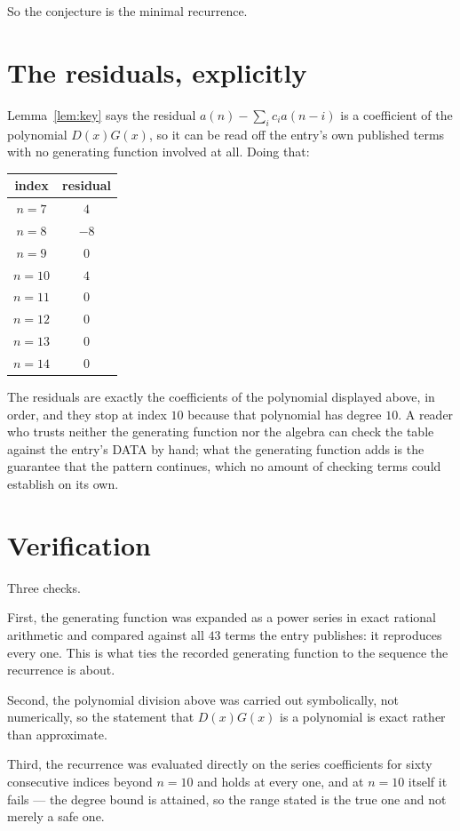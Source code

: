 \documentclass[11pt,a4paper]{article}
\theoremstyle{plain}
\theoremstyle{definition}
\begin{document}
So the conjecture is the minimal recurrence.

\section{The residuals, explicitly}

Lemma~\ref{lem:key} says the residual $a(n)-\sum_ic_ia(n-i)$ is a coefficient of the
polynomial $D(x)G(x)$, so it can be read off the entry's own published terms with no
generating function involved at all. Doing that:
\begin{center}
\begin{tabular}{cc}
index & residual \\ \hline
$n=7$ & $4$ \\
$n=8$ & $-8$ \\
$n=9$ & $0$ \\
$n=10$ & $4$ \\
$n=11$ & $0$ \\
$n=12$ & $0$ \\
$n=13$ & $0$ \\
$n=14$ & $0$
\end{tabular}
\end{center}
The residuals are exactly the coefficients of the polynomial displayed above, in order, and
they stop at index $10$ because that polynomial has degree $10$. A reader who trusts
neither the generating function nor the algebra can check the table against the entry's DATA
by hand; what the generating function adds is the guarantee that the pattern continues, which
no amount of checking terms could establish on its own.

\section{Verification}

Three checks.

First, the generating function was expanded as a power series in exact rational arithmetic and
compared against all $43$ terms the entry publishes: it reproduces every one. This is
what ties the recorded generating function to the sequence the recurrence is about.

Second, the polynomial division above was carried out symbolically, not numerically, so the
statement that $D(x)G(x)$ is a polynomial is exact rather than approximate.

Third, the recurrence was evaluated directly on the series coefficients for sixty consecutive
indices beyond $n=10$ and holds at every one, and at $n=10$ itself it fails --- the
degree bound is attained, so the range stated is the true one and not merely a safe one.
\end{document}
